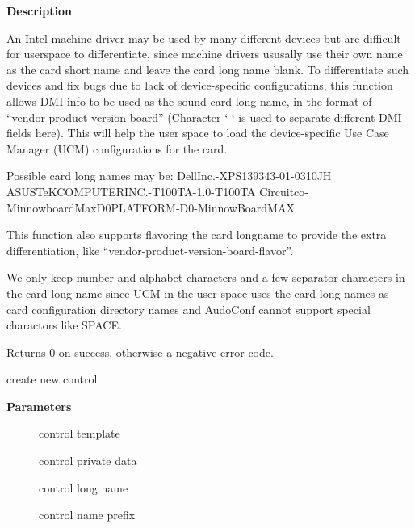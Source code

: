 \documentclass[a4paper,8pt,english]{sphinxmanual}
\begin{document}
\textbf{Description}

An Intel machine driver may be used by many different devices but are
difficult for userspace to differentiate, since machine drivers ususally
use their own name as the card short name and leave the card long name
blank. To differentiate such devices and fix bugs due to lack of
device-specific configurations, this function allows DMI info to be used
as the sound card long name, in the format of
``vendor-product-version-board''
(Character `-` is used to separate different DMI fields here).
This will help the user space to load the device-specific Use Case Manager
(UCM) configurations for the card.

Possible card long names may be:
DellInc.-XPS139343-01-0310JH
ASUSTeKCOMPUTERINC.-T100TA-1.0-T100TA
Circuitco-MinnowboardMaxD0PLATFORM-D0-MinnowBoardMAX

This function also supports flavoring the card longname to provide
the extra differentiation, like ``vendor-product-version-board-flavor''.

We only keep number and alphabet characters and a few separator characters
in the card long name since UCM in the user space uses the card long names
as card configuration directory names and AudoConf cannot support special
charactors like SPACE.

Returns 0 on success, otherwise a negative error code.

\begin{fulllineitems}
\label{sound/kernel-api/alsa-driver-api:c.snd_soc_cnew}
create new control

\end{fulllineitems}


\textbf{Parameters}
\begin{description}
\item[{}] \leavevmode
control template

\item[{}] \leavevmode
control private data

\item[{}] \leavevmode
control long name

\item[{}] \leavevmode
control name prefix

\end{description}
\end{document}
